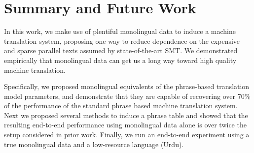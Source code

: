 \documentclass[11pt]{article}
\begin{document}





\section{Summary and Future Work} \label{sect:conc}



In this work, we make use of plentiful monolingual data to induce a machine translation system, proposing one way to reduce dependence on the expensive and sparse parallel texts assumed by state-of-the-art SMT.  We demonstrated empirically that monolingual data can get us a long way toward high quality machine translation. 

Specifically, we proposed monolingual equivalents of the phrase-based translation model parameters, and demonstrate that they are capable of recovering over 70\% of the performance of the standard phrase based machine translation system.  Next we proposed several methods to induce a phrase table and showed that the resulting end-to-end performance using monolingual data alone is over twice the setup considered in prior work.  Finally, we run an end-to-end experiment using a true monolingual data and a low-resource language (Urdu).
\end{document}
